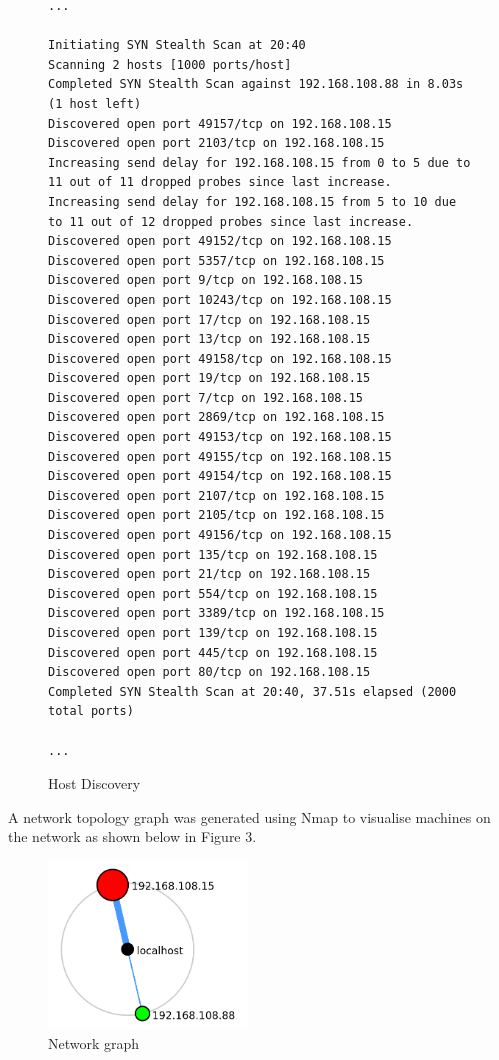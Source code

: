 \documentclass[11pt, oneside]{article}   	%
\begin{document}
\begin{figure}[h!]
	\fontsize{8pt}{4pt}
	\begin{verbatim}
...

Initiating SYN Stealth Scan at 20:40
Scanning 2 hosts [1000 ports/host]
Completed SYN Stealth Scan against 192.168.108.88 in 8.03s (1 host left)
Discovered open port 49157/tcp on 192.168.108.15
Discovered open port 2103/tcp on 192.168.108.15
Increasing send delay for 192.168.108.15 from 0 to 5 due to 11 out of 11 dropped probes since last increase.
Increasing send delay for 192.168.108.15 from 5 to 10 due to 11 out of 12 dropped probes since last increase.
Discovered open port 49152/tcp on 192.168.108.15
Discovered open port 5357/tcp on 192.168.108.15
Discovered open port 9/tcp on 192.168.108.15
Discovered open port 10243/tcp on 192.168.108.15
Discovered open port 17/tcp on 192.168.108.15
Discovered open port 13/tcp on 192.168.108.15
Discovered open port 49158/tcp on 192.168.108.15
Discovered open port 19/tcp on 192.168.108.15
Discovered open port 7/tcp on 192.168.108.15
Discovered open port 2869/tcp on 192.168.108.15
Discovered open port 49153/tcp on 192.168.108.15
Discovered open port 49155/tcp on 192.168.108.15
Discovered open port 49154/tcp on 192.168.108.15
Discovered open port 2107/tcp on 192.168.108.15
Discovered open port 2105/tcp on 192.168.108.15
Discovered open port 49156/tcp on 192.168.108.15
Discovered open port 135/tcp on 192.168.108.15
Discovered open port 21/tcp on 192.168.108.15
Discovered open port 554/tcp on 192.168.108.15
Discovered open port 3389/tcp on 192.168.108.15
Discovered open port 139/tcp on 192.168.108.15
Discovered open port 445/tcp on 192.168.108.15
Discovered open port 80/tcp on 192.168.108.15
Completed SYN Stealth Scan at 20:40, 37.51s elapsed (2000 total ports)

...
	\end{verbatim}
	\caption{Host Discovery}
\end{figure}

A network topology graph was generated using Nmap to visualise machines on the network as shown
below in Figure 3.

\begin{figure}[h!]
	\centering
	\includegraphics[width=200px]{network.png}
	\caption{Network graph}
	\label{NetworkGraph}
\end{figure}
\end{document}
